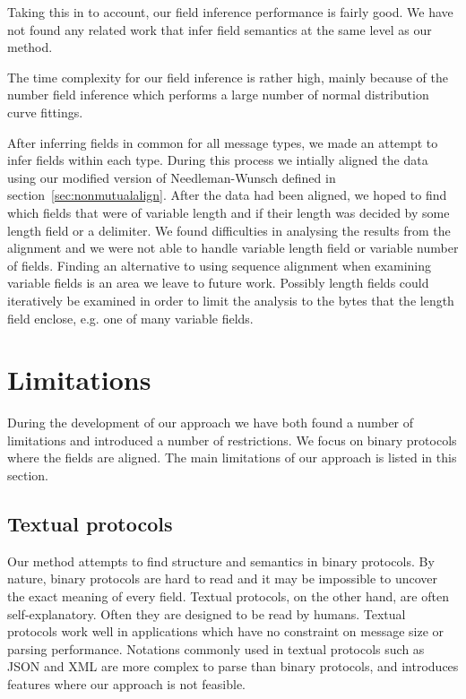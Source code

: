 \documentclass[a4paper]{report}
\begin{document}
Taking this in to account, our field inference performance is fairly good.
We have not found any related work that infer field semantics at the same
level as our method.

The time complexity for our field inference is rather high, mainly because
of the number field inference which performs a large number of normal
distribution curve fittings.

After inferring fields in common for all message types, we made an
attempt to infer fields within each type. During this process we intially
aligned the data using our modified version of Needleman-Wunsch defined in
section~\ref{sec:nonmutualalign}. After the data had been aligned, we hoped to
find which fields that were of variable length and if their length was
decided by some length field or a delimiter. We found difficulties in
analysing the results from the alignment and we were not able to handle
variable length field or variable number of fields. Finding an alternative
to using sequence alignment when examining variable fields is an area we
leave to future work. Possibly length fields could iteratively be examined
in order to limit the analysis to the bytes that the length field enclose,
e.g. one of many variable fields.

\section{Limitations}
During the development of our approach we have both found a number of
limitations and introduced a number of restrictions. We focus on binary
protocols where the fields are aligned. The main limitations of our approach
is listed in this section.

\subsection{Textual protocols}
Our method attempts to find structure and semantics in binary protocols.
By nature, binary protocols are hard to read and it may be impossible to
uncover the exact meaning of every field. Textual protocols, on the other
hand, are often self-explanatory. Often they are designed to be read by
humans. Textual protocols work well in applications which have no constraint
on message size or parsing performance. Notations commonly used in textual
protocols such as JSON and XML are more complex to parse than binary protocols,
and introduces features where our approach is not feasible.
\end{document}
